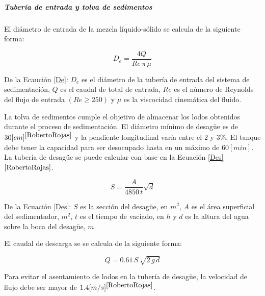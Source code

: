 \subparagraph{Tuber\'ia de entrada y tolva de sedimentos}

\noindent
\justify

El di\'ametro de entrada de la mezcla l\'iquido-s\'olido se calcula de la siguiente forma:

\begin{equation}
	D_e = \frac{4 Q}{Re \, \pi \, \mu}
	\label{De}
\end{equation}

\noindent
\justify

De la Ecauci\'on \ref{De}: $D_e$ es el di\'ametro de la tuber\'ia de entrada del sistema de sedimentaci\'on, $Q$ es el caudal de total de entrada, $Re$ es el n\'umero de Reynolds del flujo de entrada $( Re \geq 250)$ y $\mu$ es la viscocidad cinem\'atica del fluido.

La tolva de sedimentos cumple el objetivo de almacenar los lodos obtenidos durante el proceso de sedimentaci\'on. El di\'ametro m\'inimo de desag\"ue es de $30 [cm]^{\cite{RobertoRojas}}$ y la pendiente longitudinal var\'ia entre el $2$ y $3 \%$. El tanque debe tener la capacidad para ser desocupado hasta en un m\'aximo de $60 [min]$. La tuber\'ia de desag\"ue se puede calcular con base en la Ecuaci\'on \ref{Des}${\cite{RobertoRojas}}$.

\begin{equation}
	S = \frac{A}{4850 \, t} \sqrt{d}
	\label{Des}
\end{equation}

\noindent
\justify

De la Ecuaci\'on \ref{Des}: $S$ es la secci\'on del desag\"ue, en $m^2$, $A$ es el \'area superficial del sedimentador, $m^2$, $t$ es el tiempo de vaciado, en $h$ y $d$ es la altura del agua sobre la boca del desag\"ue, $m$.

\noindent
\justify

El caudal de descarga se se calcula de la siguiente forma:

\begin{equation}
	Q = 0.61 \, S \, \sqrt{2 \, g \, d}
	\label{Qdes}
\end{equation}

\noindent
\justify

Para evitar el asentamiento de lodos en la tuber\'ia de desag\"ue, la velocidad de flujo debe ser mayor de $1.4 [m/s]^{\cite{RobertoRojas}}$.